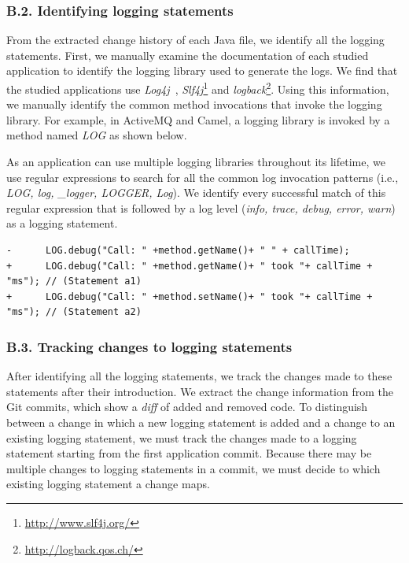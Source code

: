 \subsubsection*{B.2. Identifying logging statements}
From the extracted change history of each Java file, we identify all the logging statements.
First, we manually examine the documentation of each studied application to identify the logging library used to generate the logs. %
We find that the studied applications use \textsl{Log4j}~\cite{EMSEIAN}, \emph{Slf4j}\footnote{\url{http://www.slf4j.org/}} and \emph{logback}\footnote{\url{http://logback.qos.ch/}}.
Using this information, we manually identify the common method invocations that invoke the logging library. For example, in ActiveMQ and Camel, a logging library is invoked by a method named \emph{LOG} as shown below.


As an application can use multiple logging libraries throughout its lifetime, we use regular expressions to search for all the common log invocation patterns (i.e., \emph{LOG, log, \_logger, LOGGER, Log}). We identify every successful match of this regular expression that is followed by a log level (\emph{info, trace, debug, error, warn}) as a logging statement.
\begin{lstlisting}[caption={Selecting the best matching logging statement}, label={lst:multiplelogs}, float=*]
-      LOG.debug("Call: " +method.getName()+ " " + callTime);
+      LOG.debug("Call: " +method.getName()+ " took "+ callTime + "ms"); // (Statement a1)
+      LOG.debug("Call: " +method.setName()+ " took "+ callTime + "ms"); // (Statement a2)
\end{lstlisting}

\subsubsection*{B.3. Tracking changes to logging statements}
After identifying all the logging statements, we track the changes made to these statements after their introduction. We extract the change information from the Git commits, which show a \emph{diff} of added and removed code. To distinguish between a change in which a new logging statement is added and a change to an existing logging statement, we must track the changes made to a logging statement starting from the first application commit. Because there may be multiple changes to logging statements in a commit, we must decide to which existing logging statement a change maps.

